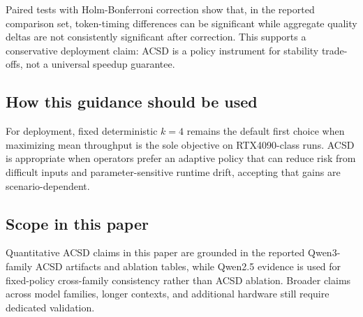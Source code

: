 Paired tests with Holm-Bonferroni correction show that, in the reported
comparison set, token-timing differences can be significant while aggregate
quality deltas are not consistently significant after correction.
This supports a conservative deployment claim: ACSD is a policy instrument for
stability trade-offs, not a universal speedup guarantee.

\subsection{How this guidance should be used}

For deployment, fixed deterministic $k{=}4$ remains the default first choice
when maximizing mean throughput is the sole objective on RTX4090-class runs.
ACSD is appropriate when operators prefer an adaptive policy that can reduce
risk from difficult inputs and parameter-sensitive runtime drift, accepting
that gains are scenario-dependent.

\subsection{Scope in this paper}

Quantitative ACSD claims in this paper are grounded in the reported
Qwen3-family ACSD artifacts and ablation tables, while Qwen2.5 evidence
is used for fixed-policy cross-family consistency rather than ACSD ablation.
Broader claims across model families, longer contexts, and additional hardware
still require dedicated validation.
